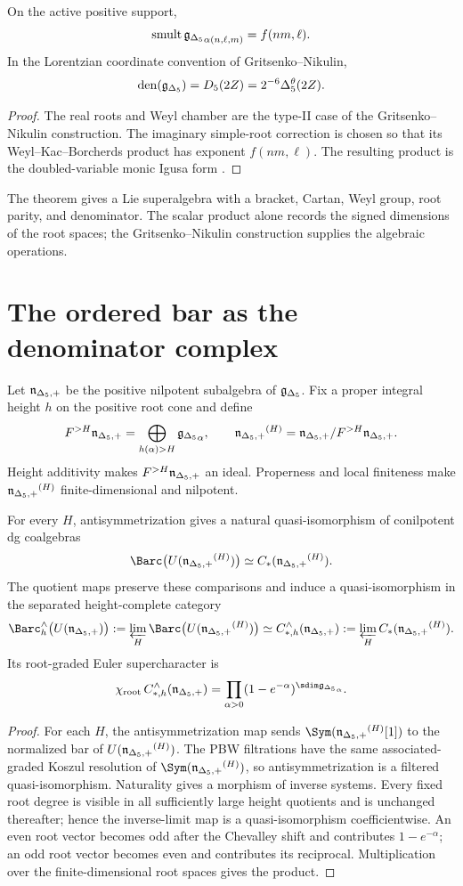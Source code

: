 \begin{theorem}
On the active positive support,
\[
 \operatorname{smult}{\mathfrak g_{\Delta_5}}_{\alpha(n,\ell,m)}=f(nm,\ell).
\]
In the Lorentzian coordinate convention of Gritsenko--Nikulin,
\[
 \operatorname{den}({\mathfrak g_{\Delta_5}})={D_5}(2Z)=2^{-6}{\Delta^{\theta}_5}(2Z).
\]
\end{theorem}
\begin{proof}
The real roots and Weyl chamber are the type-II case of the Gritsenko--Nikulin construction. The imaginary simple-root correction is chosen so that its Weyl--Kac--Borcherds product has exponent $f(nm,\ell)$. The resulting product is the doubled-variable monic Igusa form \cite{GN97,GN98a,GN98b}.
\end{proof}

The theorem gives a Lie superalgebra with a bracket, Cartan, Weyl group, root parity, and denominator. The scalar product alone records the signed dimensions of the root spaces; the Gritsenko--Nikulin construction supplies the algebraic operations.

\chapter{The ordered bar as the denominator complex}
Let ${\mathfrak n_{\Delta_5,+}}$ be the positive nilpotent subalgebra of ${\mathfrak g_{\Delta_5}}$. Fix a proper integral height $h$ on the positive root cone and define
\[
 F^{>H}{\mathfrak n_{\Delta_5,+}}=\bigoplus_{h(\alpha)>H}{\mathfrak g_{\Delta_5}}_\alpha,
 \qquad
 {\mathfrak n_{\Delta_5,+}}^{(H)}={\mathfrak n_{\Delta_5,+}}/F^{>H}{\mathfrak n_{\Delta_5,+}}.
\]
Height additivity makes $F^{>H}{\mathfrak n_{\Delta_5,+}}$ an ideal. Properness and local finiteness make ${\mathfrak n_{\Delta_5,+}}^{(H)}$ finite-dimensional and nilpotent.

\begin{theorem}
For every $H$, antisymmetrization gives a natural quasi-isomorphism of conilpotent dg coalgebras
\[
 \Barc\bigl(U(\nIg^{(H)})\bigr)\simeq C_*(\nIg^{(H)}).
\]
The quotient maps preserve these comparisons and induce a quasi-isomorphism in the separated height-complete category
\[
 \Barc_h^\wedge\bigl(U(\nIg)\bigr)
 :=\varprojlim_H\Barc\bigl(U(\nIg^{(H)})\bigr)
 \simeq
 C_{*,h}^\wedge(\nIg)
 :=\varprojlim_H C_*(\nIg^{(H)}).
\]
Its root-graded Euler supercharacter is
\[
 \chi_{\mathrm{root}}\,C_{*,h}^\wedge(\nIg)
 =\prod_{\alpha>0}
 (1-e^{-\alpha})^{\sdim\gIg_\alpha}.
\]
\end{theorem}
\begin{proof}
For each $H$, the antisymmetrization map sends $\Sym(\nIg^{(H)}[1])$ to the normalized bar of $U({\mathfrak n_{\Delta_5,+}}^{(H)})$. The PBW filtrations have the same associated-graded Koszul resolution of $\Sym(\nIg^{(H)})$, so antisymmetrization is a filtered quasi-isomorphism. Naturality gives a morphism of inverse systems. Every fixed root degree is visible in all sufficiently large height quotients and is unchanged thereafter; hence the inverse-limit map is a quasi-isomorphism coefficientwise. An even root vector becomes odd after the Chevalley shift and contributes $1-e^{-\alpha}$; an odd root vector becomes even and contributes its reciprocal. Multiplication over the finite-dimensional root spaces gives the product.
\end{proof}

